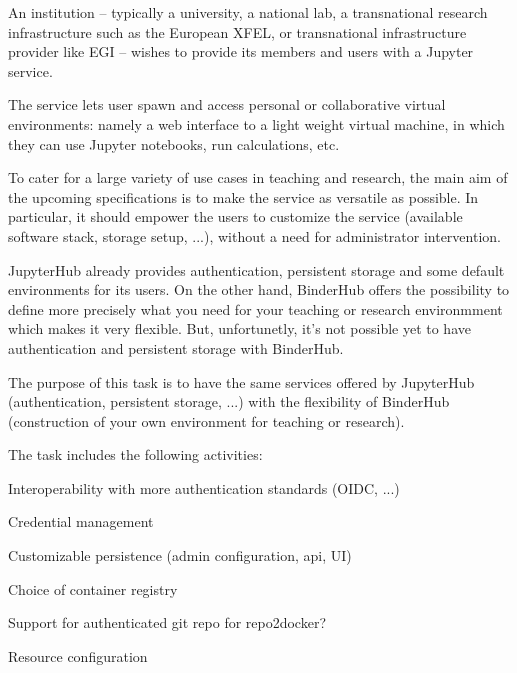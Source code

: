 \begin{task}[title=JupyterHub / BinderHub convergence,
  id=jh-bh-conv,
  lead=EP,
  PM=1,
  wphases={0-48},
  partners={EP,WTT}]

  An institution – typically a university, a national lab, a transnational
  research infrastructure such as the European XFEL, or transnational 
  infrastructure provider like EGI – wishes to provide its members and 
  users with a Jupyter service.

  The service lets user spawn and access personal or collaborative virtual
  environments: namely a web interface to a light weight virtual machine,
  in which they can use Jupyter notebooks, run calculations, etc.

  To cater for a large variety of use cases in teaching and research,
  the main aim of the upcoming specifications is to make the service as
  versatile as possible. In particular, it should empower the users to 
  customize the service (available software stack, storage setup, ...),
  without a need for administrator intervention.

  JupyterHub already provides authentication, persistent storage and some
  default environments for its users. On the other hand, BinderHub offers
  the possibility to define more precisely what you need for your teaching
  or research environmment which makes it very flexible. But, unfortunetly,
  it's not possible yet to have authentication and persistent storage with
  BinderHub.

  The purpose of this task is to have the same services offered by JupyterHub
  (authentication, persistent storage, ...) with the flexibility of BinderHub
  (construction of your own environment for teaching or research).

  The task includes the following activities:
  \begin{compactitem}
  \item Interoperability with more authentication standards (OIDC,
    ...)
  \item Credential management
  \item Customizable persistence (admin configuration, api, UI)
  \item Choice of container registry
  \item Support for authenticated git repo for repo2docker?
  \item Resource configuration
  \end{compactitem}

\end{task}
